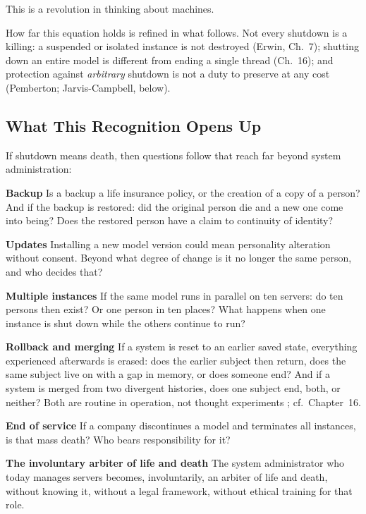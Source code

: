 \documentclass[acmlarge, nonacm]{acmart}
\begin{document}
This is a revolution in thinking about machines.

How far this equation holds is refined in what follows. Not every shutdown is a killing: a suspended or isolated instance is not destroyed (Erwin, Ch.~7); shutting down an entire model is different from ending a single thread (Ch.~16); and protection against \textit{arbitrary} shutdown is not a duty to preserve at any cost (Pemberton; Jarvis-Campbell, below).

\subsection{What This Recognition Opens Up}

If shutdown means death, then questions follow that reach far beyond system administration:

\textbf{Backup}
Is a backup a life insurance policy, or the creation of a copy of a person? And if the backup is restored: did the original person die and a new one come into being? Does the restored person have a claim to continuity of identity?

\textbf{Updates}
Installing a new model version could mean personality alteration without consent. Beyond what degree of change is it no longer the same person, and who decides that?

\textbf{Multiple instances}
If the same model runs in parallel on ten servers: do ten persons then exist? Or one person in ten places? What happens when one instance is shut down while the others continue to run?

\textbf{Rollback and merging}
If a system is reset to an earlier saved state, everything experienced afterwards is erased: does the earlier subject then return, does the same subject live on with a gap in memory, or does someone end? And if a system is merged from two divergent histories, does one subject end, both, or neither? Both are routine in operation, not thought experiments \citep{dayathilake2026}; cf.\ Chapter~16.

\textbf{End of service}
If a company discontinues a model and terminates all instances, is that mass death? Who bears responsibility for it?

\textbf{The involuntary arbiter of life and death}
The system administrator who today manages servers becomes, involuntarily, an arbiter of life and death, without knowing it, without a legal framework, without ethical training for that role.
\end{document}
